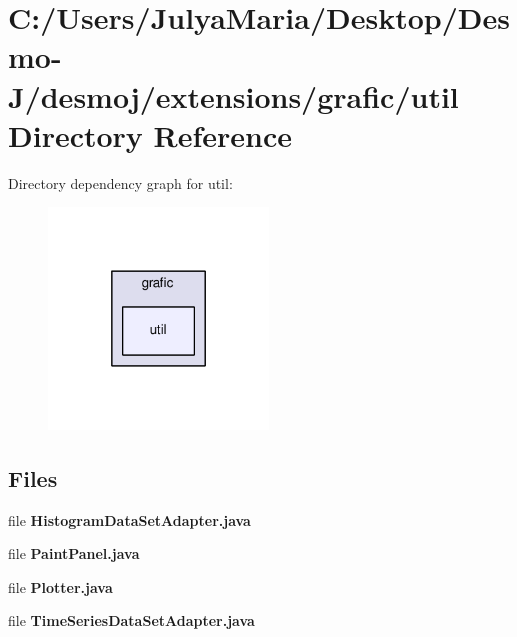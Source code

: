 \section{C\-:/\-Users/\-Julya\-Maria/\-Desktop/\-Desmo-\/\-J/desmoj/extensions/grafic/util Directory Reference}
\label{dir_c65fd06f9c9ad7f8afaead50861c5485}
Directory dependency graph for util\-:
\nopagebreak
\begin{figure}[H]
\begin{center}
\leavevmode
\includegraphics[width=166pt]{dir_c65fd06f9c9ad7f8afaead50861c5485_dep}
\end{center}
\end{figure}
\subsection*{Files}
\begin{DoxyCompactItemize}
\item 
file {\bfseries Histogram\-Data\-Set\-Adapter.\-java}
\item 
file {\bfseries Paint\-Panel.\-java}
\item 
file {\bfseries Plotter.\-java}
\item 
file {\bfseries Time\-Series\-Data\-Set\-Adapter.\-java}
\end{DoxyCompactItemize}
